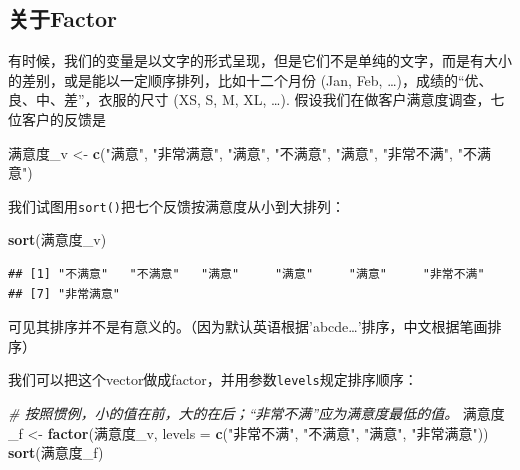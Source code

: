\documentclass[]{book}
\newenvironment{Shaded}{\begin{snugshade}}{\end{snugshade}}
\newcommand{\CommentTok}[1]{\textcolor[rgb]{0.56,0.35,0.01}{\textit{#1}}}
\newcommand{\DataTypeTok}[1]{\textcolor[rgb]{0.13,0.29,0.53}{#1}}
\newcommand{\KeywordTok}[1]{\textcolor[rgb]{0.13,0.29,0.53}{\textbf{#1}}}
\newcommand{\NormalTok}[1]{#1}
\newcommand{\StringTok}[1]{\textcolor[rgb]{0.31,0.60,0.02}{#1}}
\begin{document}
\hypertarget{factor}{%
\subsection{关于Factor}\label{factor}}

有时候，我们的变量是以文字的形式呈现，但是它们不是单纯的文字，而是有大小的差别，或是能以一定顺序排列，比如十二个月份 (Jan, Feb, \ldots{})，成绩的``优、良、中、差''，衣服的尺寸 (XS, S, M, XL, \ldots{}). 假设我们在做客户满意度调查，七位客户的反馈是

\begin{Shaded}
\begin{Highlighting}[]
\NormalTok{满意度_v <-}\StringTok{ }\KeywordTok{c}\NormalTok{(}\StringTok{"满意"}\NormalTok{, }\StringTok{"非常满意"}\NormalTok{, }\StringTok{"满意"}\NormalTok{, }\StringTok{"不满意"}\NormalTok{, }\StringTok{"满意"}\NormalTok{, }\StringTok{"非常不满"}\NormalTok{,  }\StringTok{"不满意"}\NormalTok{)}
\end{Highlighting}
\end{Shaded}

我们试图用\texttt{sort()}把七个反馈按满意度从小到大排列：

\begin{Shaded}
\begin{Highlighting}[]
\KeywordTok{sort}\NormalTok{(满意度_v)}
\end{Highlighting}
\end{Shaded}

\begin{verbatim}
## [1] "不满意"   "不满意"   "满意"     "满意"     "满意"     "非常不满"
## [7] "非常满意"
\end{verbatim}

可见其排序并不是有意义的。（因为默认英语根据'abcde\ldots{}'排序，中文根据笔画排序）

我们可以把这个vector做成factor，并用参数\texttt{levels}规定排序顺序：

\begin{Shaded}
\begin{Highlighting}[]
\CommentTok{# 按照惯例，小的值在前，大的在后；“非常不满”应为满意度最低的值。}
\NormalTok{满意度_f <-}\StringTok{ }\KeywordTok{factor}\NormalTok{(满意度_v, }\DataTypeTok{levels =} \KeywordTok{c}\NormalTok{(}\StringTok{"非常不满"}\NormalTok{, }\StringTok{"不满意"}\NormalTok{, }\StringTok{"满意"}\NormalTok{, }\StringTok{"非常满意"}\NormalTok{))}
\KeywordTok{sort}\NormalTok{(满意度_f)}
\end{Highlighting}
\end{Shaded}
\end{document}
